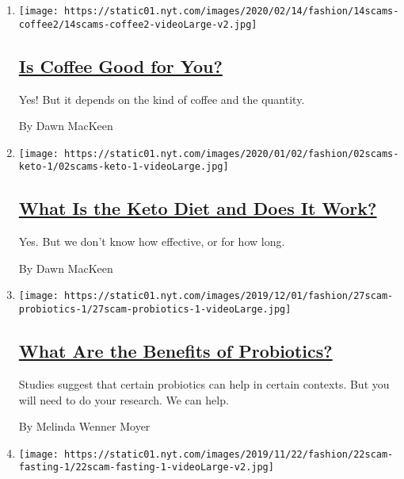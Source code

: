 \begin{enumerate}
\def\labelenumi{\arabic{enumi}.}
\item
  \texttt{[image: https://static01.nyt.com/images/2020/02/14/fashion/14scams-coffee2/14scams-coffee2-videoLarge-v2.jpg]}

  \hypertarget{is-coffee-good-for-you}{%
  \subsection{\texorpdfstring{\href{/2020/02/13/style/self-care/coffee-benefits.html}{Is
  Coffee Good for
  You?}}{Is Coffee Good for You?}}\label{is-coffee-good-for-you}}

  Yes! But it depends on the kind of coffee and the quantity.

  By Dawn MacKeen
\item
  \texttt{[image: https://static01.nyt.com/images/2020/01/02/fashion/02scams-keto-1/02scams-keto-1-videoLarge.jpg]}

  \hypertarget{what-is-the-keto-diet-and-does-it-work}{%
  \subsection{\texorpdfstring{\href{/2020/01/02/style/self-care/keto-diet-explained-benefits.html}{What
  Is the Keto Diet and Does It
  Work?}}{What Is the Keto Diet and Does It Work?}}\label{what-is-the-keto-diet-and-does-it-work}}

  Yes. But we don't know how effective, or for how long.

  By Dawn MacKeen
\item
  \texttt{[image: https://static01.nyt.com/images/2019/12/01/fashion/27scam-probiotics-1/27scam-probiotics-1-videoLarge.jpg]}

  \hypertarget{what-are-the-benefits-of-probiotics}{%
  \subsection{\texorpdfstring{\href{/2019/11/27/style/self-care/probiotics-benefits.html}{What
  Are the Benefits of
  Probiotics?}}{What Are the Benefits of Probiotics?}}\label{what-are-the-benefits-of-probiotics}}

  Studies suggest that certain probiotics can help in certain contexts.
  But you will need to do your research. We can help.

  By Melinda Wenner Moyer
\item
  \texttt{[image: https://static01.nyt.com/images/2019/11/22/fashion/22scam-fasting-1/22scam-fasting-1-videoLarge-v2.jpg]}


\end{enumerate}

